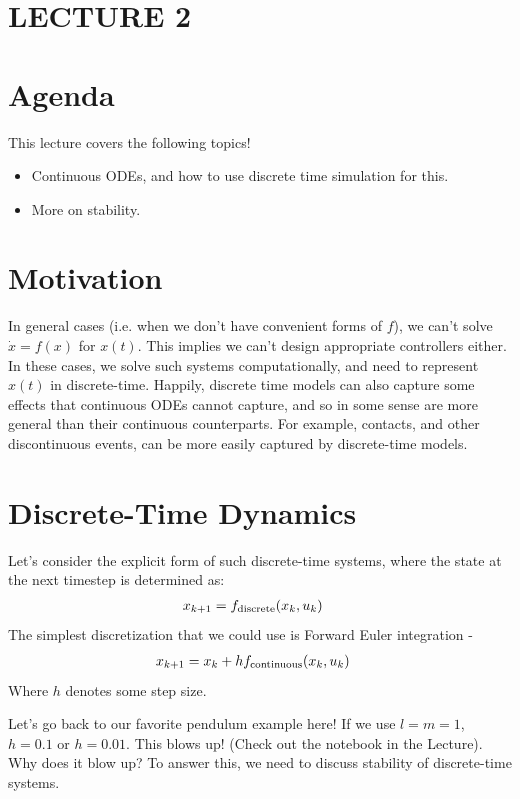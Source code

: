 \newpage
\section*{LECTURE 2}
\section{Agenda}

This lecture covers the following topics! 
\begin{itemize}
    \item Continuous ODEs, and how to use discrete time simulation for this. 
    \item More on stability. 
\end{itemize}

\section{Motivation}
In general cases (i.e. when we don't have convenient forms of $f$), we can't solve $\dot{x} = f(x)$ for $x(t)$. 
This implies we can't design appropriate controllers either. 
In these cases, we solve such systems computationally, and need to represent $x(t)$ in discrete-time. 
Happily, discrete time models can also capture some effects that continuous ODEs cannot capture, and so in some sense are more general than their continuous counterparts. For example, contacts, and other discontinuous events, can be more easily captured by discrete-time models. 

\section{Discrete-Time Dynamics}
Let's consider the explicit form of such discrete-time systems, where the state at the next timestep is determined as:
\begin{align}
    x_{k+1} &= f_{\rm discrete} (x_k, u_k)
\end{align}
The simplest discretization that we could use is Forward Euler integration - 
\begin{align}
    x_{k+1} &= x_k + h f_{\rm continuous} (x_k, u_k)
\end{align}
Where $h$ denotes some step size.

\noindent
Let's go back to our favorite pendulum example here! If we use $l=m=1$, $h=0.1$ or $h=0.01$. 
This blows up! (Check out the notebook in the Lecture). Why does it blow up? 
To answer this, we need to discuss stability of discrete-time systems.

